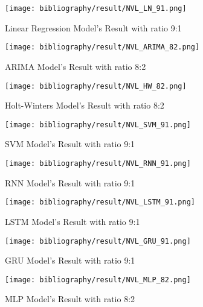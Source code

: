 \documentclass{ieeeojies}
\begin{document}
	\begin{figure}[H]
		\centering
		\begin{minipage}{0.9\linewidth}
			\centering
			\texttt{[image: bibliography/result/NVL\_LN\_91.png]}
			\caption{Linear Regression Model's Result with ratio 9:1}
			\label{fig2.1}
		\end{minipage}
	\end{figure}
	\begin{figure}[H]
		\centering
		\begin{minipage}{0.9\linewidth}
			\centering
			\texttt{[image: bibliography/result/NVL\_ARIMA\_82.png]}
			\caption{ARIMA Model's Result with ratio 8:2}
			\label{fig2.2}
		\end{minipage}
	\end{figure}
	\begin{figure}[H]
		\centering
		\begin{minipage}{0.9\linewidth}
			\centering
			\texttt{[image: bibliography/result/NVL\_HW\_82.png]}
			\caption{Holt-Winters Model's Result with ratio 8:2}
			\label{fig2.3}
		\end{minipage}
	\end{figure}
	\begin{figure}[H]
		\centering
		\begin{minipage}{0.9\linewidth}
			\centering
			\texttt{[image: bibliography/result/NVL\_SVM\_91.png]}
			\caption{SVM Model's Result with ratio 9:1}
			\label{fig2.4}
		\end{minipage}
	\end{figure}
	\begin{figure}[H]
		\centering
		\begin{minipage}{0.9\linewidth}
			\centering
			\texttt{[image: bibliography/result/NVL\_RNN\_91.png]}
			\caption{RNN Model's Result with ratio 9:1}
			\label{fig2.5}
		\end{minipage}
	\end{figure}
	\begin{figure}[H]
		\centering
		\begin{minipage}{0.9\linewidth}
			\centering
			\texttt{[image: bibliography/result/NVL\_LSTM\_91.png]}
			\caption{LSTM Model's Result with ratio 9:1}
			\label{fig2.6}
		\end{minipage}
	\end{figure}
	\begin{figure}[H]
		\centering
		\begin{minipage}{0.9\linewidth}
			\centering
			\texttt{[image: bibliography/result/NVL\_GRU\_91.png]}
			\caption{GRU Model's Result with ratio 9:1}
			\label{fig2.7}
		\end{minipage}
	\end{figure}
	\begin{figure}[H]
		\centering
		\begin{minipage}{0.9\linewidth}
			\centering
			\texttt{[image: bibliography/result/NVL\_MLP\_82.png]}
			\caption{MLP Model's Result with ratio 8:2}
			\label{fig2.8}
		\end{minipage}
	\end{figure}
	
\end{document}
